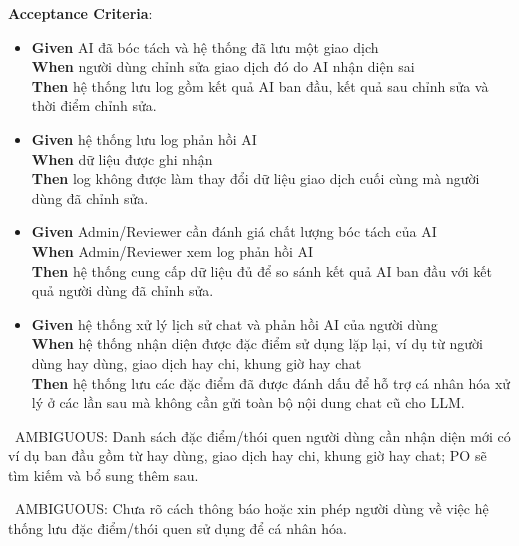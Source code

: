 \textbf{Acceptance Criteria}:

\begin{itemize}
\item \textbf{Given} AI đã bóc tách và hệ thống đã lưu một giao dịch  \\ \hspace*{1.5em}  \textbf{When} người dùng chỉnh sửa giao dịch đó do AI nhận diện sai  \\ \hspace*{1.5em}  \textbf{Then} hệ thống lưu log gồm kết quả AI ban đầu, kết quả sau chỉnh sửa và thời điểm chỉnh sửa.
\item \textbf{Given} hệ thống lưu log phản hồi AI  \\ \hspace*{1.5em}  \textbf{When} dữ liệu được ghi nhận  \\ \hspace*{1.5em}  \textbf{Then} log không được làm thay đổi dữ liệu giao dịch cuối cùng mà người dùng đã chỉnh sửa.
\item \textbf{Given} Admin/Reviewer cần đánh giá chất lượng bóc tách của AI  \\ \hspace*{1.5em}  \textbf{When} Admin/Reviewer xem log phản hồi AI  \\ \hspace*{1.5em}  \textbf{Then} hệ thống cung cấp dữ liệu đủ để so sánh kết quả AI ban đầu với kết quả người dùng đã chỉnh sửa.
\item \textbf{Given} hệ thống xử lý lịch sử chat và phản hồi AI của người dùng  \\ \hspace*{1.5em}  \textbf{When} hệ thống nhận diện được đặc điểm sử dụng lặp lại, ví dụ từ người dùng hay dùng, giao dịch hay chi, khung giờ hay chat  \\ \hspace*{1.5em}  \textbf{Then} hệ thống lưu các đặc điểm đã được đánh dấu để hỗ trợ cá nhân hóa xử lý ở các lần sau mà không cần gửi toàn bộ nội dung chat cũ cho LLM.
\end{itemize}
\warningicon\  AMBIGUOUS: Danh sách đặc điểm/thói quen người dùng cần nhận diện mới có ví dụ ban đầu gồm từ hay dùng, giao dịch hay chi, khung giờ hay chat; PO sẽ tìm kiếm và bổ sung thêm sau.



\warningicon\  AMBIGUOUS: Chưa rõ cách thông báo hoặc xin phép người dùng về việc hệ thống lưu đặc điểm/thói quen sử dụng để cá nhân hóa.




